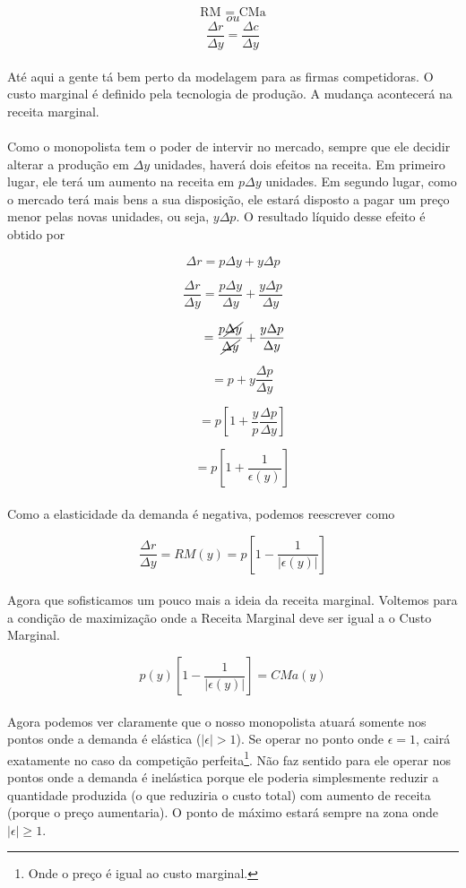 \documentclass[a4paper,11pt,oneside]{book}
\theoremstyle{definition}
\theoremstyle{break}
\begin{document}
$$ \textrm{RM = CMa} $$
$$ ou $$
$$ \frac{\Delta r}{\Delta y} = \frac{\Delta c}{\Delta y} $$
\\
Até aqui a gente tá bem perto da modelagem para as firmas competidoras. O custo marginal é definido pela tecnologia de produção. A mudança acontecerá na receita marginal. 
\\
\\
Como o monopolista tem o poder de intervir no mercado, sempre que ele decidir alterar a produção em $\Delta y$ unidades, haverá dois efeitos na receita. Em primeiro lugar, ele terá um aumento na receita em $p\Delta y$ unidades. Em segundo lugar, como o mercado terá mais bens a sua disposição, ele estará disposto a pagar um preço menor pelas novas unidades, ou seja, $y\Delta p$. O resultado líquido desse efeito é obtido por

$$\Delta r = p \Delta y + y \Delta p$$

$$ \frac{\Delta r}{\Delta y} = 
\frac{p \Delta y}{\Delta y} + 
\frac{y \Delta p}{\Delta y} $$

$$ \phantom{\frac{\Delta r}{\Delta y}} = 
\frac{p \cancel{\Delta y}}{\cancel{\Delta y}} + 
\frac{y \Delta p}{\Delta y} $$

$$ \phantom{\frac{\Delta r}{\Delta y}} = p + y\frac{\Delta p}{\Delta y} $$

$$ \phantom{\frac{\Delta r}{\Delta y}} = 
p \left[ 1 + \frac{y}{p}\frac{\Delta p}{\Delta y} \right] $$

$$ \phantom{\frac{\Delta r}{\Delta y}} = 
p \left[ 1 + \frac{1}{\epsilon(y)} \right] $$
\\
Como a elasticidade da demanda é negativa, podemos reescrever como

$$ \frac{\Delta r}{\Delta y} = 
RM(y) =
p \left[ 1 - \frac{1}{|\epsilon(y)|} \right] $$
\\
Agora que sofisticamos um pouco mais a ideia da receita marginal. Voltemos para a condição de maximização onde a Receita Marginal deve ser igual a o Custo Marginal.

$$ p(y) \left[ 1 - \frac{1}{|\epsilon(y)|} \right] = CMa(y) $$
\\
Agora podemos ver claramente que o nosso monopolista atuará somente nos pontos onde a demanda é elástica ($|\epsilon| > 1$). Se operar no ponto onde $\epsilon = 1$, cairá exatamente no caso da competição perfeita\footnote{Onde o preço é igual ao custo marginal.}. Não faz sentido para ele operar nos pontos onde a demanda é inelástica porque ele poderia simplesmente reduzir a quantidade produzida (o que reduziria o custo total) com aumento de receita (porque o preço aumentaria). O ponto de máximo estará sempre na zona onde $|\epsilon| \geq 1$.
\end{document}
